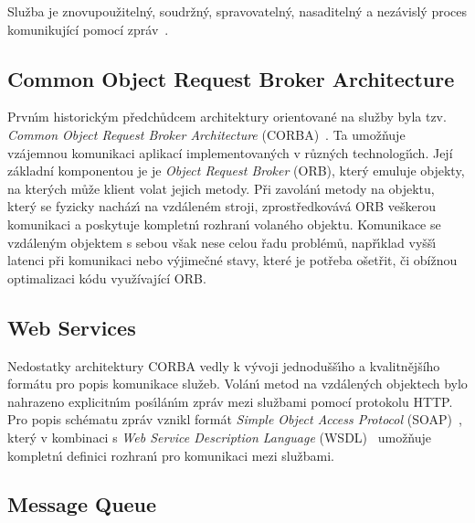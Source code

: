 \begin{definition}
    Služba je znovupoužitelný, soudržný, spravovatelný, nasaditelný a nezávislý proces komunikující
    pomocí zpráv~\cite{papazoglou2003service}\cite{dragoni2017microservices}.
\end{definition}

\subsection{Common Object Request Broker Architecture}\label{sec:corba}

Prvn\'{\i}m historick\'ym předchůdcem architektury orientované na služby
byla tzv. \textit{Common Object Request Broker Architecture}
(\gls{CORBA})~\cite{siegel2000corba}. Ta umožňuje vzájemnou komunikaci aplikací
implementovan\'ych v různ\'ych technologi\'{\i}ch. Její základní komponentou je
je \textit{Object Request Broker} (\gls{ORB}), kter\'y emuluje objekty,
na kter\'ych může klient volat jejich metody. Při zavolán\'{\i} metody
na objektu, kter\'y se fyzicky nacház\'{\i} na vzdáleném stroji,
zprostředkovává \gls{ORB} veškerou komunikaci a poskytuje kompletn\'{\i} rozhran\'{\i}
volaného objektu. Komunikace se vzdálen\'ym objektem s sebou však nese celou řadu problémů,
např\'{\i}klad vyšš\'{\i} latenci při komunikaci nebo v\'yjimečné stavy, které je potřeba
ošetřit, či obížnou optimalizaci kódu využívající \gls{ORB}.

\subsection{Web Services}

Nedostatky architektury \gls{CORBA} vedly k vývoji jednodušš\'{\i}ho
a kvalitnějšího formátu pro popis komunikace služeb. Volán\'{\i} metod na vzdálen\'ych objektech
bylo nahrazeno explicitn\'{\i}m pos\'{\i}lán\'{\i}m zpráv mezi službami pomocí protokolu \gls{HTTP}.
Pro popis schématu zpráv vznikl formát \textit{Simple Object Access
Protocol} (\gls{SOAP})~\cite{box2000simple}, kter\'y v kombinaci s
\textit{Web Service Description Language} (\gls{WSDL})~\cite{christensen2001web}
umožňuje kompletn\'{\i} definici rozhran\'{\i} pro komunikaci mezi službami.

\subsection{Message Queue}


